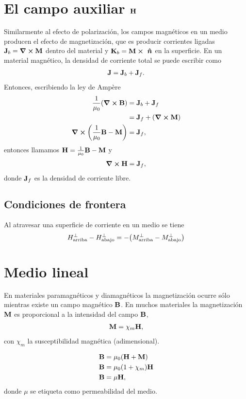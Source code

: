 \section{El campo auxiliar $\vb{H}$}
Similarmente al efecto de polarización, los campos magnéticos 
en un medio producen el efecto de magnetización, que es 
producir corrientes ligadas $\vb{J}_b=\curl{\vb{M}}$ dentro del 
material y $\vb{K}_b=\vb{M}\cp \uv{n}$ en la superficie. En un 
material magnético, la densidad de corriente total se puede 
escribir como 
\begin{align}
\vb{J}=\vb{J}_b+\vb{J}_f.
\end{align}
Entonces, escribiendo la ley de Ampère
\begin{align}
\frac{1}{\mu_0}\qty(\curl{\vb{B}})&=\vb{J}_b+\vb{J}_f\\
&=\vb{J}_f+\qty(\curl{\vb{M}})\\
\curl{\qty(\frac{1}{\mu_0}\vb{B}-\vb{M})}&=\vb{J}_f,
\end{align}
entonces llamamos $\vb{H}=\frac{1}{\mu_0}\vb{B}-\vb{M}$ y
\begin{align}
\curl{\vb{H}}=\vb{J}_f,
\end{align}
donde $\vb{J}_f$ es la densidad de corriente libre.
\subsection{Condiciones de frontera}
Al atravesar una superficie de corriente en un medio se tiene
\begin{align}
H_{\text{arriba}}^{\perp}-H_{\text{abajo}}^{\perp}=
-\qty(M_{\text{arriba}}^{\perp}-M_{\text{abajo}}^{\perp})
\end{align}

\section{Medio lineal}
En materiales paramagnéticos y diamagnéticos la magnetización
ocurre sólo mientras existe un campo magnético $\vb{B}$. En muchos 
materiales la magnetización $\vb{M}$ es proporcional a la intensidad 
del campo $\vb{B}$,
\begin{align}
\vb{M}=\chi_m\vb{H},
\end{align}
con $\chi_m$ la susceptibilidad magnética (adimensional).

\begin{align}
\vb{B}&=\mu_0\qty(\vb{H}+\vb{M})\\
\vb{B}&=\mu_0\qty(1+\chi_m)\vb{H}\\
\vb{B}&=\mu\vb{H},
\end{align}
donde $\mu$ se etiqueta como permeabilidad del medio. 
